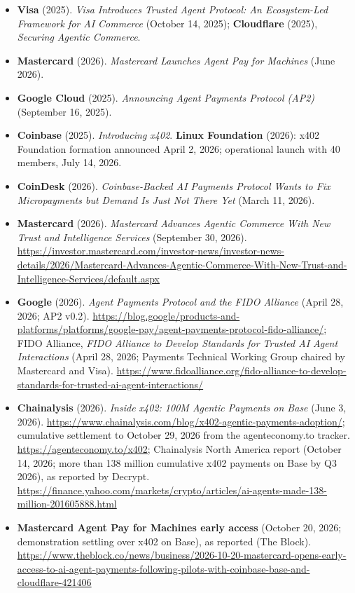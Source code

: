 \documentclass[11pt,letterpaper]{article}
\begin{document}
\begin{itemize}[leftmargin=1.5em]
  \item \textbf{Visa} (2025). \textit{Visa Introduces Trusted Agent Protocol: An Ecosystem-Led Framework for AI Commerce} (October 14, 2025); \textbf{Cloudflare} (2025), \textit{Securing Agentic Commerce}.
  \item \textbf{Mastercard} (2026). \textit{Mastercard Launches Agent Pay for Machines} (June 2026).
  \item \textbf{Google Cloud} (2025). \textit{Announcing Agent Payments Protocol (AP2)} (September 16, 2025).
  \item \textbf{Coinbase} (2025). \textit{Introducing x402}. \textbf{Linux Foundation} (2026): x402 Foundation formation announced April 2, 2026; operational launch with 40 members, July 14, 2026.
  \item \textbf{CoinDesk} (2026). \textit{Coinbase-Backed AI Payments Protocol Wants to Fix Micropayments but Demand Is Just Not There Yet} (March 11, 2026).
  \item \textbf{Mastercard} (2026). \textit{Mastercard Advances Agentic Commerce With New Trust and Intelligence Services} (September 30, 2026). \url{https://investor.mastercard.com/investor-news/investor-news-details/2026/Mastercard-Advances-Agentic-Commerce-With-New-Trust-and-Intelligence-Services/default.aspx}
  \item \textbf{Google} (2026). \textit{Agent Payments Protocol and the FIDO Alliance} (April 28, 2026; AP2 v0.2). \url{https://blog.google/products-and-platforms/platforms/google-pay/agent-payments-protocol-fido-alliance/}; FIDO Alliance, \textit{FIDO Alliance to Develop Standards for Trusted AI Agent Interactions} (April 28, 2026; Payments Technical Working Group chaired by Mastercard and Visa). \url{https://www.fidoalliance.org/fido-alliance-to-develop-standards-for-trusted-ai-agent-interactions/}
  \item \textbf{Chainalysis} (2026). \textit{Inside x402: 100M Agentic Payments on Base} (June 3, 2026). \url{https://www.chainalysis.com/blog/x402-agentic-payments-adoption/}; cumulative settlement to October 29, 2026 from the agenteconomy.to tracker. \url{https://agenteconomy.to/x402}; Chainalysis North America report (October 14, 2026; more than 138 million cumulative x402 payments on Base by Q3 2026), as reported by Decrypt. \url{https://finance.yahoo.com/markets/crypto/articles/ai-agents-made-138-million-201605888.html}
  \item \textbf{Mastercard Agent Pay for Machines early access} (October 20, 2026; demonstration settling over x402 on Base), as reported (The Block). \url{https://www.theblock.co/news/business/2026-10-20-mastercard-opens-early-access-to-ai-agent-payments-following-pilots-with-coinbase-base-and-cloudflare-421406}

\end{itemize}
\end{document}
